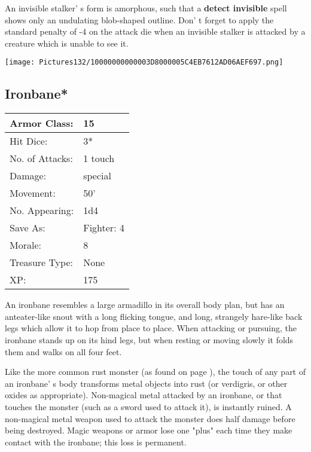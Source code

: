 \documentclass[a4paper,twoside,openany,10pt]{book}
\begin{document}
\begin{multicols}{2}
An invisible stalker' s form is amorphous, such that a \textbf{detect invisible} spell shows only an undulating blob-shaped outline. Don' t forget to apply the standard penalty of -4 on the attack die when an invisible stalker is attacked by a creature which is unable to see it.


\begin{center}
	\texttt{[image: Pictures132/10000000000003D8000005C4EB7612AD06AEF697.png]}
\end{center}

\subsection*{Ironbane*}\label{ironbane}

\begin{tabularx}{0.50\textwidth}{@{}lX@{}}
Armor Class: & 15 \\\hline
Hit Dice: & 3* \\\hline
No. of Attacks: & 1 touch \\\hline
Damage: & special \\\hline
Movement: & 50' \\\hline
No. Appearing: & 1d4 \\\hline
Save As: & Fighter: 4 \\\hline
Morale: & 8 \\\hline
Treasure Type: & None \\\hline
XP: & 175 \\\hline
\end{tabularx}\medskip

An ironbane resembles a large armadillo in its overall body plan, but has an anteater-like snout with a long flicking tongue, and long, strangely hare-like back legs which allow it to hop from place to place. When attacking or pursuing, the ironbane stands up on its hind legs, but when resting or moving slowly it folds them and walks on all four feet.

Like the more common rust monster (as found on page \hyperlink{rust-monster}{\pageref{rust-monster}}), the touch of any part of an ironbane' s body transforms metal objects into rust (or verdigris, or other oxides as appropriate). Non-magical metal attacked by an ironbane, or that touches the monster (such as a sword used to attack it), is instantly ruined. A non-magical metal weapon used to attack the monster does half damage before being destroyed. Magic weapons or armor lose one "plus" each time they make contact with the ironbane; this loss is permanent.


\end{multicols}
\end{document}
